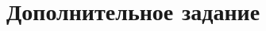 \documentclass[12pt, a4paper, oneside, final]{article}
\begin{document}
%
%		
%
%		
%		
%		
%
%
%
%		
%		
%		
%		
%		
%		
%
	\newpage
	\section*{Дополнительное задание}
\end{document}
